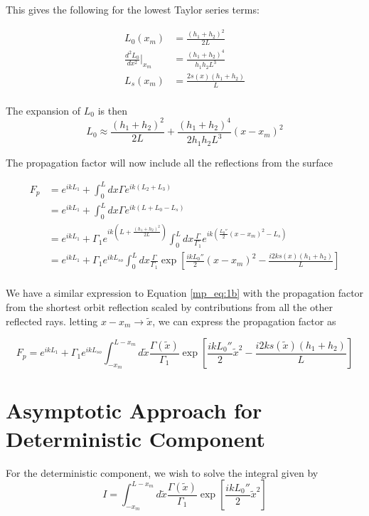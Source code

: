 This gives the following for the lowest Taylor series terms:

\begin{equation}
\begin{aligned}
L_0(x_m) &= \frac{(h_1+h_2)^2}{2L} \\
\frac{d^2L_0}{dx^2}\big|_{x_m}  &= \frac{(h_1+h_2)^4}{h_1h_2L^3} \\
L_s(x_m) &= \frac{2s(x)(h_1 + h_2)}{L}\\
\end{aligned}
\label{mp_eq:17a}
\end{equation}

The expansion of $L_0$ is then
\begin{equation}
L_0 \approx \frac{(h_1+h_2)^2}{2L} + \frac{(h_1+h_2)^4}{2h_1h_2L^3}(x-x_m)^2
\label{mp_eq:18}
\end{equation}

The propagation factor will now include all the reflections from the surface

\begin{equation}
\begin{aligned}
F_p &= e^{ikL_1} + \int_0^Ldx\Gamma  e^{ik(L_2+L_3)}\\
&= e^{ikL_1} + \int_0^Ldx\Gamma  e^{ik(L+L_0-L_s)}\\
&= e^{ikL_1} +  \Gamma_1e^{ik(L+\frac{(h_1+h_2)^2}{2L})}\int_0^Ldx\frac{\Gamma}{\Gamma_1} e^{ik(\frac{L_0''}{2}(x-x_m)^2-L_s)}\\
&= e^{ikL_1} + \Gamma_1e^{ikL_{so}}\int_0^Ldx\frac{\Gamma}{\Gamma_1} \exp\left[\frac{ikL_0''}{2}(x-x_m)^2 - \frac{i2ks(x)(h_1+h_2)}{L}\right]\\
\end{aligned}
\label{mp_eq:20}
\end{equation}

We have a similar expression to Equation \ref{mp_eq:1b} with the propagation factor from the shortest orbit reflection scaled by contributions from all the other reflected rays. letting $x-x_m \rightarrow \tilde{x}$, we can express the propagation factor as

\begin{equation}
\boxed{F_p = e^{ikL_1} + \Gamma_1 e^{ikL_{so}}\int_{-x_m}^{L-x_m}d\tilde{x} \frac{\Gamma(\tilde{x})}{\Gamma_1}\exp\left[\frac{ikL_0''}{2}\tilde{x}^2 - \frac{i2ks(\tilde{x})(h_1+h_2)}{L}\right]}
\label{mp_eq:21}
\end{equation}

\section{Asymptotic Approach for Deterministic Component}
For the deterministic component, we wish to solve the integral given by
\begin{equation}
I = \int_{-x_m}^{L-x_m}d\tilde{x} \frac{\Gamma(\tilde{x})}{\Gamma_1}\exp\left[\frac{ikL_0''}{2}\tilde{x}^2\right]
\label{mp_eq:22}
\end{equation}

